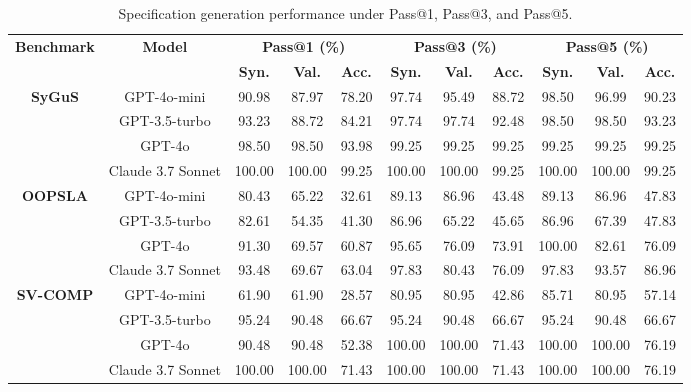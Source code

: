 



\begin{table}[h!]
\centering
\caption{Specification generation performance under Pass@1, Pass@3, and Pass@5.}
\label{tab:performance_rates_model}

\setlength{\tabcolsep}{2pt}
\begin{adjustbox}{max width=\textwidth}
\begin{tabular}{cc ccc ccc ccc}
\toprule
\multirow{2}{*}{\textbf{Benchmark}} & \multirow{2}{*}{\textbf{Model}}
& \multicolumn{3}{c}{\textbf{Pass@1 (\%)}}
& \multicolumn{3}{c}{\textbf{Pass@3 (\%)}}
& \multicolumn{3}{c}{\textbf{Pass@5 (\%)}} \\
\cmidrule(lr){3-5} \cmidrule(lr){6-8} \cmidrule(lr){9-11}
& & \textbf{Syn.} & \textbf{Val.} & \textbf{Acc.}
& \textbf{Syn.} & \textbf{Val.} & \textbf{Acc.}
& \textbf{Syn.} & \textbf{Val.} & \textbf{Acc.} \\
\midrule

\multirow{4}{*}{\textbf{SyGuS}}
 & GPT-4o-mini & 90.98 & 87.97 & 78.20 & 97.74 & 95.49 & 88.72 & 98.50 & 96.99 & 90.23 \\
 & GPT-3.5-turbo & 93.23 & 88.72 & 84.21 & 97.74 & 97.74 & 92.48 & 98.50 & 98.50 & 93.23 \\
 & GPT-4o & 98.50 & 98.50 & 93.98 & 99.25 & 99.25 & 99.25 & 99.25 & 99.25 & 99.25 \\
 & Claude 3.7 Sonnet & 100.00 & 100.00 & 99.25 & 100.00 & 100.00 & 99.25 & 100.00 & 100.00 & 99.25 \\
    \midrule

\multirow{4}{*}{\textbf{OOPSLA}}
 & GPT-4o-mini & 80.43 & 65.22 & 32.61 & 89.13 & 86.96 & 43.48 & 89.13 & 86.96 & 47.83 \\
 & GPT-3.5-turbo & 82.61 & 54.35 & 41.30 & 86.96 & 65.22 & 45.65 & 86.96 & 67.39 & 47.83 \\
 & GPT-4o & 91.30 & 69.57 & 60.87 & 95.65 & 76.09 & 73.91 & 100.00 & 82.61 & 76.09 \\
 & Claude 3.7 Sonnet & 93.48 & 69.67 & 63.04 & 97.83 & 80.43 & 76.09 & 97.83 & 93.57 & 86.96 \\
\midrule

\multirow{4}{*}{\textbf{SV-COMP}}
 & GPT-4o-mini & 61.90 & 61.90 & 28.57 & 80.95 & 80.95 & 42.86 & 85.71 & 80.95 & 57.14 \\
 & GPT-3.5-turbo & 95.24 & 90.48 & 66.67 & 95.24 & 90.48 & 66.67 & 95.24 & 90.48 & 66.67 \\
 & GPT-4o & 90.48 & 90.48 & 52.38 & 100.00 & 100.00 & 71.43 & 100.00 & 100.00 & 76.19 \\
 & Claude 3.7 Sonnet & 100.00 & 100.00 & 71.43 & 100.00 & 100.00 & 71.43 & 100.00 & 100.00 & 76.19 \\
\midrule


\end{tabular}
\end{adjustbox}
\end{table}
